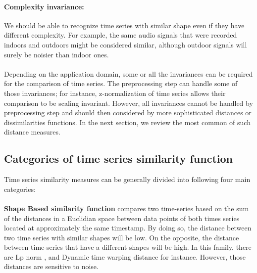 \paragraph{Complexity invariance:} We should be able to recognize time series with similar shape even if they have different complexity.  For example, the same audio signals that were recorded indoors and outdoors might be considered similar, although outdoor signals will surely be noisier than indoor ones. 


\paragraph{}Depending on the application domain, some or all the invariances can be required for the comparison of time series. The preprocessing step can handle some of those invariances; for instance, z-normalization of time series allows their comparison to be scaling invariant. However, all invariances cannot be handled by preprocessing step and should then considered by more sophisticated distances or dissimilarities functions. In the next section, we review the most common of such distance measures.





\subsection{Categories of time series similarity function}


Time series similarity measures can be generally divided into following four main categories:

\paragraph{}\textbf{Shape Based similarity function} compares two time-series based on the sum of the distances in a Euclidian space between data points of both times series located at approximately the same timestamp. By doing so, the distance between two time series with similar shapes will be low. On the opposite, the distance between time-series that have a different shapes will be high. In this family, there are Lp norm \cite{yi2000fast} \cite{keogh2003need}, and Dynamic time warping distance \cite{ MyersRabinerRosenberg1980} for instance. However, those distances are sensitive to noise.


